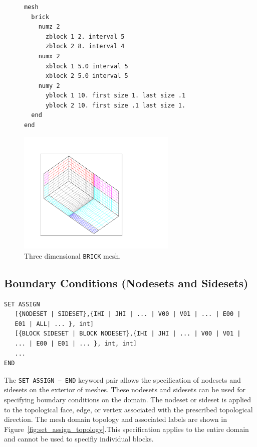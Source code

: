 \begin{figure}[htbp]
\centering
  \begin{minipage}[c]{0.4\linewidth}
    \centering
{\ttfamily \begin{verbatim}










mesh
  brick
    numz 2
      zblock 1 2. interval 5
      zblock 2 8. interval 4
    numx 2
      xblock 1 5.0 interval 5
      xblock 2 5.0 interval 5
    numy 2
      yblock 1 10. first size 1. last size .1
      yblock 2 10. first size .1 last size 1.
  end
end
\end{verbatim}}
  \end{minipage}%
  \hfil
  \begin{minipage}[c]{0.6\linewidth}
    \centering
      \includegraphics[width=3.0in]{figures/brick}
  \end{minipage}
  \caption{Three dimensional \texttt{BRICK} mesh.}
  \label{fig:brick1}
\end{figure}


\clearpage
\subsection{Boundary Conditions (Nodesets and Sidesets)}
\label{sec:nodesets-sidests}

{\ttfamily \small \begin{verbatim}
SET ASSIGN
   [{NODESET | SIDESET},{IHI | JHI | ... | V00 | V01 | ... | E00 |
   E01 | ALL| ... }, int]
   [{BLOCK SIDESET | BLOCK NODESET},{IHI | JHI | ... | V00 | V01 |
   ... | E00 | E01 | ... }, int, int]
   ...
END
\end{verbatim}
}

The \texttt{SET ASSIGN -- END} keyword pair allows the specification
of nodesets and sidesets on the exterior of meshes.  These
nodesets and sidesets can be used for specifying boundary conditions
on the domain. The nodeset or sideset is applied to the topological
face, edge, or vertex associated with the prescribed topological
direction. The mesh domain topology and associated labels are
shown in Figure~\ref{fig:set_assign_topology}.This specification
applies to the entire  domain and cannot be used to
specifiy individual blocks.

